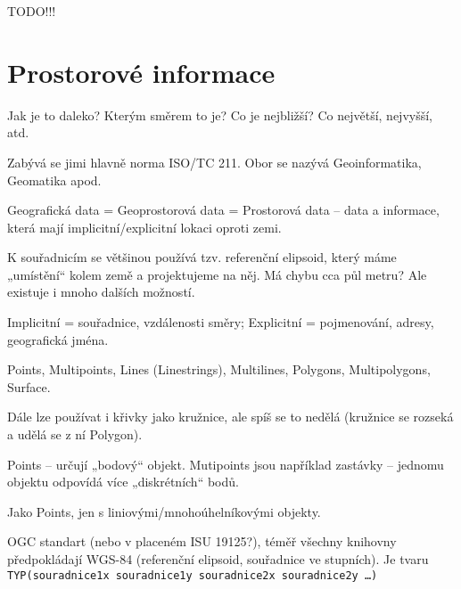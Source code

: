 \documentclass[12pt]{article}					%
\begin{document}
TODO!!!


\section{Prostorové informace}
\begin{poznamka}
	Jak je to daleko? Kterým směrem to je? Co je nejbližší? Co největší, nejvyšší, atd.
\end{poznamka}

\begin{definice}
	Zabývá se jimi hlavně norma ISO/TC 211. Obor se nazývá Geoinformatika, Geomatika apod.

	Geografická data = Geoprostorová data = Prostorová data -- data a informace, která mají implicitní/explicitní lokaci oproti zemi.

	K souřadnicím se většinou používá tzv. referenční elipsoid, který máme „umístění“ kolem země a projektujeme na něj. Má chybu cca půl metru? Ale existuje i mnoho dalších možností.

	Implicitní = souřadnice, vzdálenosti směry; Explicitní = pojmenování, adresy, geografická jména.
\end{definice}

\begin{definice}[Typy]
	Points, Multipoints, Lines (Linestrings), Multilines, Polygons, Multipolygons, Surface.

	Dále lze používat i křivky jako kružnice, ale spíš se to nedělá (kružnice se rozseká a udělá se z ní Polygon).
\end{definice}

\begin{definice}
	Points -- určují „bodový“ objekt.
	Mutipoints jsou například zastávky -- jednomu objektu odpovídá více „diskrétních“ bodů.
\end{definice}

\begin{definice}
	Jako Points, jen s liniovými/mnohoúhelníkovými objekty.
\end{definice}

\begin{definice}
	OGC standart (nebo v placeném ISU 19125?), téměř všechny knihovny předpokládají WGS-84 (referenční elipsoid, souřadnice ve stupních). Je tvaru \verb|TYP(souradnice1x souradnice1y souradnice2x souradnice2y …)|
\end{definice}
\end{document}
